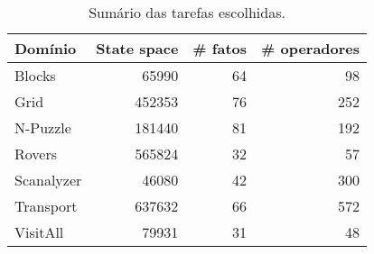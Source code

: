\begin{table}[tb]
\centering
\caption[]{Sumário das tarefas escolhidas.}
\vspace{\baselineskip}
\begin{tabular}{lrrr}
\toprule
Domínio     & State space    & \# fatos & \# operadores \\ \midrule
Blocks     & 65990       & 64       & 98           \\
Grid       & 452353      & 76       & 252          \\
N-Puzzle   & 181440      & 81       & 192          \\
Rovers     & 565824      & 32       & 57           \\
Scanalyzer & 46080       & 42       & 300          \\
Transport  & 637632      & 66       & 572          \\
VisitAll   & 79931       & 31       & 48           \\ \bottomrule
\end{tabular}
\label{tab:tasks_info}
\end{table}
